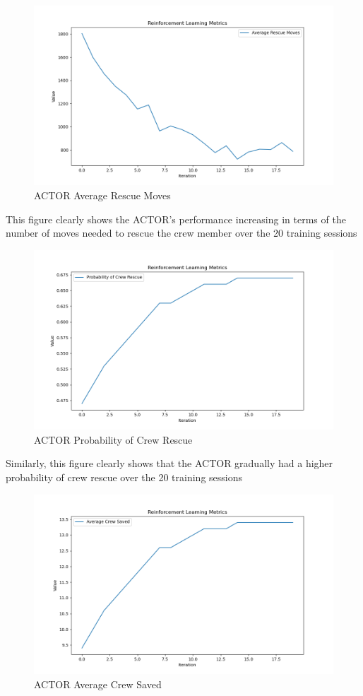 \documentclass[11pt]{article}
\begin{document}
\begin{figure}[H]
    \centering
    \includegraphics[width=0.8\linewidth]{actormoves.png}
    \caption{ACTOR Average Rescue Moves}
\end{figure}

This figure clearly shows the ACTOR's performance increasing in terms of the number of moves needed to rescue the crew member over the 20 training sessions

\begin{figure}[H]
    \centering
    \includegraphics[width=0.8\linewidth]{actorprob.png}
    \caption{ACTOR Probability of Crew Rescue}
\end{figure}

Similarly, this figure clearly shows that the ACTOR gradually had a higher probability of crew rescue over the 20 training sessions

\begin{figure}[H]
    \centering
    \includegraphics[width=0.8\linewidth]{actorcount.png}
    \caption{ACTOR Average Crew Saved}
\end{figure}
\end{document}
